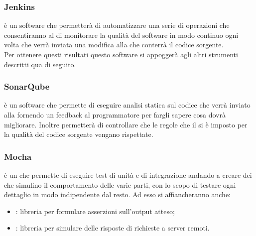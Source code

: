 \subsubsection{Jenkins}
 è un software che permetterà di automatizzare una serie di operazioni che consentiranno al  di monitorare la qualità del software in modo continuo ogni volta che verrà inviata una modifica alla  che conterrà il codice sorgente. \\
Per ottenere questi risultati questo software si appoggerà agli altri strumenti descritti qua di seguito.

\subsubsection{SonarQube}
 è un software che permette di eseguire analisi statica sul codice che verrà inviato alla  fornendo un feedback al programmatore per fargli sapere cosa dovrà migliorare. Inoltre permetterà di controllare che le regole che il  si è imposto per la qualità del codice sorgente vengano rispettate.

\subsubsection{Mocha}
 è un  che permette di eseguire test di unità e di integrazione andando a creare dei  che simulino il comportamento delle varie parti, con lo scopo di testare ogni dettaglio in modo indipendente dal resto. Ad esso si affiancheranno anche:
\begin{itemize}
\item \textbf{}: libreria per formulare asserzioni sull'output atteso;
\item \textbf{}: libreria per simulare delle risposte di richieste a server remoti.
\end{itemize}
